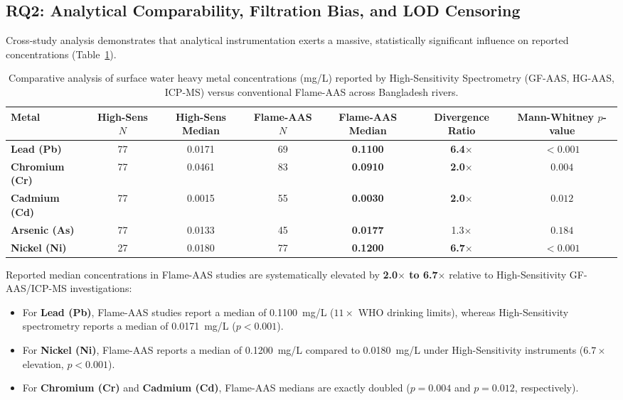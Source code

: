 \documentclass[authoryear,preprint,12pt]{elsarticle}
\begin{document}
\subsection{RQ2: Analytical Comparability, Filtration Bias, and LOD Censoring}
Cross-study analysis demonstrates that analytical instrumentation exerts a massive, statistically significant influence on reported concentrations (Table~\ref{tab:spectrometry}).

\begin{table}[htbp]
\centering
\small
\caption{Comparative analysis of surface water heavy metal concentrations (mg/L) reported by High-Sensitivity Spectrometry (GF-AAS, HG-AAS, ICP-MS) versus conventional Flame-AAS across Bangladesh rivers.}
\label{tab:spectrometry}
\begin{tabular}{lcccccc}
\toprule
Metal & High-Sens $N$ & High-Sens Median & Flame-AAS $N$ & Flame-AAS Median & Divergence Ratio & Mann-Whitney $p$-value \\
\midrule
\textbf{Lead (Pb)} & 77 & 0.0171 & 69 & \textbf{0.1100} & \textbf{6.4$\times$} & $<0.001$ \\
\textbf{Chromium (Cr)} & 77 & 0.0461 & 83 & \textbf{0.0910} & \textbf{2.0$\times$} & $0.004$ \\
\textbf{Cadmium (Cd)} & 77 & 0.0015 & 55 & \textbf{0.0030} & \textbf{2.0$\times$} & $0.012$ \\
\textbf{Arsenic (As)} & 77 & 0.0133 & 45 & \textbf{0.0177} & 1.3$\times$ & $0.184$ \\
\textbf{Nickel (Ni)} & 27 & 0.0180 & 77 & \textbf{0.1200} & \textbf{6.7$\times$} & $<0.001$ \\
\bottomrule
\end{tabular}
\end{table}

Reported median concentrations in Flame-AAS studies are systematically elevated by \textbf{2.0$\times$ to 6.7$\times$} relative to High-Sensitivity GF-AAS/ICP-MS investigations:
\begin{itemize}
    \item For \textbf{Lead (Pb)}, Flame-AAS studies report a median of 0.1100~mg/L ($11\times$ WHO drinking limits), whereas High-Sensitivity spectrometry reports a median of 0.0171~mg/L ($p < 0.001$).
    \item For \textbf{Nickel (Ni)}, Flame-AAS reports a median of 0.1200~mg/L compared to 0.0180~mg/L under High-Sensitivity instruments ($6.7\times$ elevation, $p < 0.001$).
    \item For \textbf{Chromium (Cr)} and \textbf{Cadmium (Cd)}, Flame-AAS medians are exactly doubled ($p = 0.004$ and $p = 0.012$, respectively).
\end{itemize}
\end{document}
